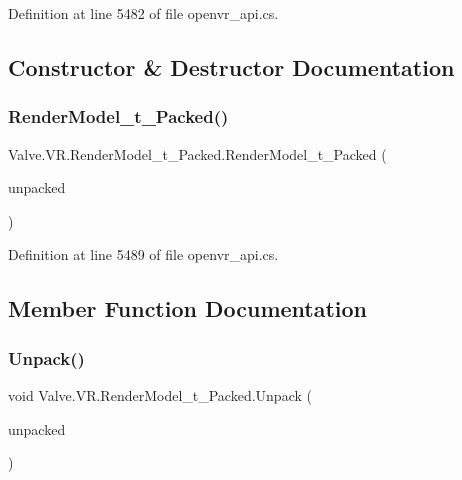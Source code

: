 Definition at line 5482 of file openvr\+\_\+api.\+cs.



\subsection{Constructor \& Destructor Documentation}
\mbox{\label{struct_valve_1_1_v_r_1_1_render_model__t___packed_ae0022ba91aeab058e00680c5aa9be90f}} 
\subsubsection{\texorpdfstring{RenderModel\_t\_Packed()}{RenderModel\_t\_Packed()}}
{\footnotesize\ttfamily Valve.\+V\+R.\+Render\+Model\+\_\+t\+\_\+\+Packed.\+Render\+Model\+\_\+t\+\_\+\+Packed (\begin{DoxyParamCaption}\item[{\mbox{\hyperlink{struct_valve_1_1_v_r_1_1_render_model__t}{Render\+Model\+\_\+t}}}]{unpacked }\end{DoxyParamCaption})}



Definition at line 5489 of file openvr\+\_\+api.\+cs.



\subsection{Member Function Documentation}
\mbox{\label{struct_valve_1_1_v_r_1_1_render_model__t___packed_a2a2f2e0c52d442e0b2647a91ae9ed0bc}} 
\subsubsection{\texorpdfstring{Unpack()}{Unpack()}}
{\footnotesize\ttfamily void Valve.\+V\+R.\+Render\+Model\+\_\+t\+\_\+\+Packed.\+Unpack (\begin{DoxyParamCaption}\item[{ref \mbox{\hyperlink{struct_valve_1_1_v_r_1_1_render_model__t}{Render\+Model\+\_\+t}}}]{unpacked }\end{DoxyParamCaption})}



